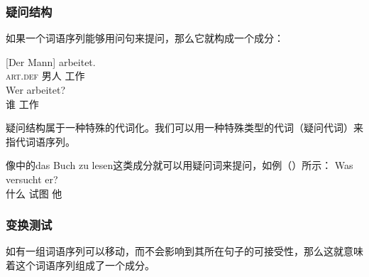 \subsubsection{疑问结构}
如果一个词语序列能够用问句来提问，那么它就构成一个成分：

\eal
\ex 
\gll {}[Der Mann] arbeitet.\\
	 \spacebr{}\textsc{art}.\textsc{def} 男人 工作\\
\ex 
\gll Wer arbeitet?\\
	 谁 工作\\
\zl

\noindent
疑问结构属于一种特殊的代词化。我们可以用一种特殊类型的代词（疑问代词）来指代词语序列。

像中的das Buch zu lesen这类成分就可以用疑问词来提问，如例（）所示：
\ea
\gll Was versucht er?\\
     什么 试图 他\\
\z


\subsubsection{变换测试}
如有一组词语序列可以移动，而不会影响到其所在句子的可接受性，那么这就意味着这个词语序列组成了一个成分。

